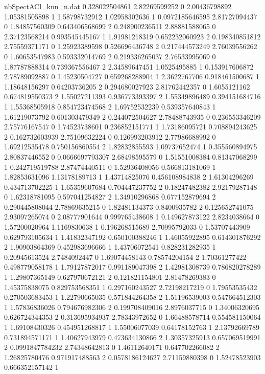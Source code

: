 \begin{filecontents}{nbSpectACl_knn_n.dat}
0.328022504861 2.82269599252 0
2.00436798892 1.05381505898 1
1.58798732912 1.02958302636 1
0.0972185646595 2.81727094437 0
1.84857560309 0.643406568699 2
0.248900236511 2.88881588065 0
2.37123568214 0.993545445167 1
1.91981218319 0.652232060923 2
0.198340851812 2.75559371171 0
1.25923389598 0.526696436748 2
0.217444573249 2.76039556262 0
1.60653547983 0.593332014769 2
0.219336265037 2.76533995069 0
1.87787888314 0.739367556467 2
2.34589647451 1.0525495885 1
0.153917606872 2.78789092887 0
1.45230504727 0.659268288904 1
2.3622767706 0.918461500687 1
1.18648156297 0.64203736205 2
0.294680027923 2.81762442357 0
1.6055121162 0.674819550373 2
1.55027211393 0.936773393397 2
1.55349896489 0.394151684716 1
1.55368505918 0.854723474568 2
1.69752532239 0.539357640843 1
1.61219073792 0.601303479349 2
0.244072504627 2.78488743935 0
0.236553346209 2.75776167547 0
1.74523738601 0.236852151771 1
1.73186095721 0.708894243625 2
0.162732603939 2.75109632224 0
0.126993203912 2.77986688992 0
1.69212535478 0.750156860554 2
1.82832855593 1.09737652474 1
0.355560894975 2.80837446552 0
0.0666697793307 2.68498595579 0
1.51551008384 0.81347068299 1
0.242719519788 2.87474440511 0
1.52936408056 0.566813181069 1
1.82853631096 1.13178189713 1
1.43714825076 0.456108984838 2
1.61304296269 0.434713702225 1
1.65359607684 0.704447237752 2
0.18247482382 2.92179287148 0
1.62318781095 0.597041254827 2
1.34910296868 0.677152879694 2
0.290445808044 2.78869635215 0
1.82481134373 0.8400935782 2
0.125652741075 2.93097265074 0
2.08777901644 0.999765438608 1
0.149627873122 2.8234038664 0
1.57200020964 1.1169830638 1
0.196268515689 2.70995792033 0
1.53707443909 0.629793105634 1
1.41832347192 0.650100388246 1
1.46055922895 0.614301876292 2
1.90903864369 0.452983696666 1
1.43706072541 0.828231282935 1
0.20945613524 2.7484092447 0
1.69074458143 0.78574204154 2
1.70361277422 0.498779058178 1
1.79127872017 0.991189047398 2
1.42981308739 0.786820278289 1
1.29807365149 0.627970672121 2
0.121821154801 2.81478269383 0
1.45375838075 0.829753568351 1
0.297160243527 2.72198217219 0
1.79553535432 0.270503683453 1
1.22790665035 0.571844264358 2
1.51196539003 0.547664512303 1
1.57836836026 0.794676982306 2
0.199708409016 2.8976037715 0
1.34006320695 0.626724344353 2
0.313695934937 2.78343972652 0
1.66488578714 0.554581150064 1
1.69108430326 0.454951268817 1
1.55006077039 0.64178152763 1
2.13792669789 0.731894571171 1
1.40627943979 0.473634130866 2
1.30357325913 0.657069519991 2
0.0991847784232 2.74348642813 0
1.46112640171 0.647702266082 2
1.26825780476 0.971917488563 2
0.0578186124627 2.71159880398 0
1.52478523903 0.666352157142 1

\end{filecontents}
